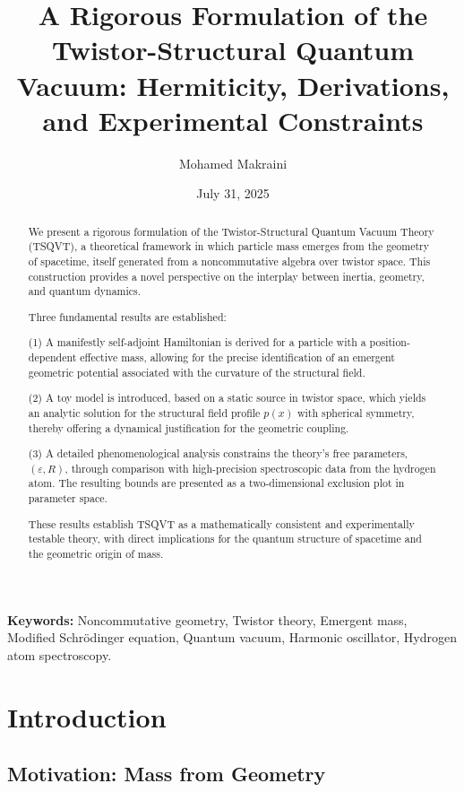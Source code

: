 \documentclass[a4paper]{article}
\title{\textbf{A Rigorous Formulation of the Twistor-Structural Quantum Vacuum: Hermiticity, Derivations, and Experimental Constraints}}
\author{Mohamed Makraini}
\affil{Independent Researcher, Málaga, Spain \\ \href{mailto:mk.makraini@mk4physics.eu}{mk.makraini@mk4physics.eu}}
\date{July 31, 2025}
\begin{document}
	
	\maketitle
\begin{abstract}
      We present a rigorous formulation of the Twistor-Structural Quantum Vacuum Theory (TSQVT), a theoretical framework in which particle mass emerges from the geometry of spacetime, itself generated from a noncommutative algebra over twistor space. This construction provides a novel perspective on the interplay between inertia, geometry, and quantum dynamics.
      
      Three fundamental results are established:  
       
      (1) A manifestly self-adjoint Hamiltonian is derived for a particle with a position-dependent effective mass, allowing for the precise identification of an emergent geometric potential associated with the curvature of the structural field.
      
      (2) A toy model is introduced, based on a static source in twistor space, which yields an analytic solution for the structural field profile \( p(x) \) with spherical symmetry, thereby offering a dynamical justification for the geometric coupling.  
     
     (3) A detailed phenomenological analysis constrains the theory’s free parameters, \( (\varepsilon, R) \), through comparison with high-precision spectroscopic data from the hydrogen atom. The resulting bounds are presented as a two-dimensional exclusion plot in parameter space.

     These results establish TSQVT as a mathematically consistent and experimentally testable theory, with direct implications for the quantum structure of spacetime and the geometric origin of mass.
\end{abstract}
      
      \textbf{Keywords:} Noncommutative geometry, Twistor theory, Emergent mass, Modified Schrödinger equation, Quantum vacuum, Harmonic oscillator, Hydrogen atom spectroscopy.

\section{Introduction}

\subsection{Motivation: Mass from Geometry}
\end{document}
